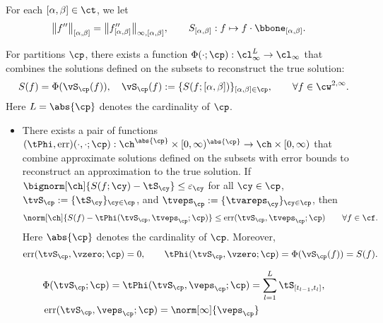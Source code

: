 \documentclass[]{elsarticle}
\DeclareMathOperator{\err}{err}
\theoremstyle{definition}
\theoremstyle{remark}
\newcommand{\Hnorm}[1]{\norm[\ch]{#1}}
\begin{document}
For each $[\alpha,\beta]  \in \ct$,  we let
%
%
\begin{align*}
&  \bigl \lVert f'' \bigr \rVert_{[\alpha,\beta]} =  \bigl \lVert f''_{[\alpha,\beta] } \bigr \rVert_{\infty,[\alpha,\beta]}, \qquad S_{[\alpha,\beta]}: f \mapsto f \cdot \bbone_{[\alpha,\beta]}.
\end{align*}

For partitions $\cp$, there exists a function $\Phi(\cdot; \cp): \cl_{\infty}^L \to \cl_{\infty}$ that combines the solutions defined on the subsets to reconstruct the true solution:
\[
S(f) = \Phi(\vS_{\cp}(f)), \quad \vS_{\cp}(f):= \{S(f; [\alpha, \beta])\}_{[\alpha, \beta] \in \cp}, \qquad \forall f \in \cw^{2,\infty}.
\]
Here $L=\abs{\cp}$ denotes the cardinality of $\cp$.
\begin{itemize}
\item There exists a pair of functions $(\tPhi,\err)(\cdot,\cdot; \cp): \ch^{\abs{\cp}} \times [0,\infty)^{\abs{\cp}} \to \ch \times [0,\infty)$ that combine approximate solutions defined on the subsets with error bounds to reconstruct an approximation to the true solution. If $\bignorm[\ch]{S(f;\cy) - \tS_{\cy}} \le \varepsilon_{\cy}$ for all $\cy \in \cp$, $\tvS_{\cp} := \{\tS_{\cy}\}_{\cy \in \cp}$,  and $\tveps_{\cp} := \{\tvareps_{\cy}\}_{\cy \in \cp}$, then
\begin{equation*}
\Hnorm{S(f) -  \tPhi(\tvS_{\cp}, \tveps_{\cp} ;\cp)} \le \err(\tvS_{\cp}, \tveps_{\cp} ;\cp) \qquad \forall f \in \cf.
\end{equation*}
Here $\abs{\cp}$ denotes the cardinality of $\cp$. Moreover,
\[
\err(\tvS_{\cp}, \vzero ;\cp) = 0, \qquad \tPhi(\tvS_{\cp}, \vzero ;\cp) = \Phi(\vS_{\cp}(f)) = S(f).
\]
\end{itemize}


\begin{align*}
& \Phi(\tvS_{\cp};\cp) = \tPhi(\tvS_{\cp},\veps_{\cp};\cp) = \sum_{l=1}^L  \tS_{[t_{l-1},t_l]}, \\
&\err(\tvS_{\cp},\veps_{\cp};\cp) = \norm[\infty]{\veps_{\cp}}
\end{align*}
\end{document}
